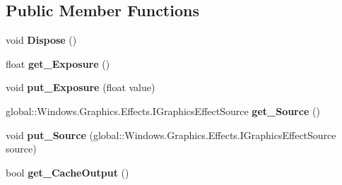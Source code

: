 \subsection*{Public Member Functions}
\begin{DoxyCompactItemize}
\item 
\mbox{\label{class_microsoft_1_1_graphics_1_1_canvas_1_1_effects_1_1_exposure_effect_a073502db74a16a0bc3b88fd3e0feee8a}} 
void {\bfseries Dispose} ()
\item 
\mbox{\label{class_microsoft_1_1_graphics_1_1_canvas_1_1_effects_1_1_exposure_effect_a21127a47d22be5f3657dce651488a984}} 
float {\bfseries get\+\_\+\+Exposure} ()
\item 
\mbox{\label{class_microsoft_1_1_graphics_1_1_canvas_1_1_effects_1_1_exposure_effect_ae2886e4afaf9fb5cc87189bfa0b30600}} 
void {\bfseries put\+\_\+\+Exposure} (float value)
\item 
\mbox{\label{class_microsoft_1_1_graphics_1_1_canvas_1_1_effects_1_1_exposure_effect_a3a4a21d04c4c1e3ab6ff7ab1a75397c8}} 
global\+::\+Windows.\+Graphics.\+Effects.\+I\+Graphics\+Effect\+Source {\bfseries get\+\_\+\+Source} ()
\item 
\mbox{\label{class_microsoft_1_1_graphics_1_1_canvas_1_1_effects_1_1_exposure_effect_ad8302b23b9b65d3b241aa0a15850c411}} 
void {\bfseries put\+\_\+\+Source} (global\+::\+Windows.\+Graphics.\+Effects.\+I\+Graphics\+Effect\+Source source)
\item 
\mbox{\label{class_microsoft_1_1_graphics_1_1_canvas_1_1_effects_1_1_exposure_effect_a6d781774b332d50000568372636dd32c}} 
bool {\bfseries get\+\_\+\+Cache\+Output} ()
\item 
\mbox{\label{class_microsoft_1_1_graphics_1_1_canvas_1_1_effects_1_1_exposure_effect_a173a563c6748ed7d1a15e042ffd9f8b1}} 

\end{DoxyCompactItemize}
